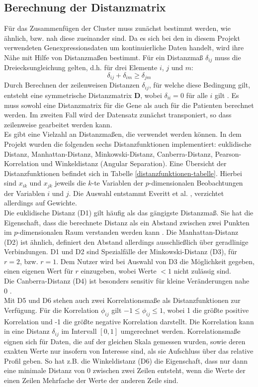 \documentclass[12pt]{article}
\begin{document}
\subsection{Berechnung der Distanzmatrix}
\label{distanzfunktionen}
Für das Zusammenfügen der Cluster muss zunächst bestimmt werden, wie ähnlich, bzw. nah diese zueinander sind. Da es sich bei den in diesem Projekt verwendeten Genexpressionsdaten um kontinuierliche Daten handelt, wird ihre Nähe mit Hilfe von Distanzmaßen bestimmt. Für ein Distanzmaß $\delta_{ij}$ muss die Dreiecksungleichung gelten, d.h. für drei Elemente $i$, $j$ und $m$: 
\[ \delta_{ij} + \delta_{im} \ge \delta_{jm} \]
Durch Berechnen der zeilenweisen Distanzen  \( \delta_{ij} \), für welche diese Bedingung gilt, entsteht eine symmetrische Distanzmatrix \( \mathbf{D}\), wobei \( \delta_{ii}  = 0\) für alle \( i \) gilt \cite{Everitt2011}. Es muss sowohl eine Distanzmatrix für die Gene als auch für die Patienten berechnet werden. Im zweiten Fall wird der Datensatz zunächst transponiert, so dass zeilenweise gearbeitet werden kann.\\
Es gibt eine Vielzahl an Distanzmaßen, die verwendet werden können. In dem Projekt wurden die folgenden sechs Distanzfunktionen implementiert: euklidische Distanz, Manhattan-Distanz, Minkowski-Distanz, Canberra-Distanz, Pearson-Korrelation und Winkeldistanz (Angular Separation). Eine Übersicht der Distanzfunktionen befindet sich in Tabelle \ref{distanzfunktionen-tabelle}. Hierbei sind \( x_{ik} \) und \( x_{jk} \) jeweils die \(k\)-te Variablen der \(p\)-dimensionalen Beobachtungen der Variablen \(i\) und \(j\). Die Auswahl entstammt Everitt et al. \cite{Everitt2011}, verzichtet allerdings auf Gewichte.\\
Die euklidische Distanz (D1) gilt häufig als das gängigste Distanzmaß. Sie hat die Eigenschaft, dass die berechnete Distanz als ein Abstand zwischen zwei Punkten im $p$-dimensionalen Raum verstanden werden kann \cite{Everitt2011}. Die Manhattan-Distanz (D2) ist ähnlich, definiert den Abstand allerdings ausschließlich über geradlinige Verbindungen. D1 und D2 sind Spezialfälle der Minkowski-Distanz (D3), für $r = 2$, bzw. $r = 1$. Dem Nutzer wird bei Auswahl von D3 die Möglichkeit gegeben, einen eigenen Wert für $r$ einzugeben, wobei Werte $<1$ nicht zulässig sind.\\
Die Canberra-Distanz (D4) ist besonders sensitiv für kleine Veränderungen nahe 0 \cite{Everitt2011}. \\
Mit D5 und D6 stehen auch zwei Korrelationsmaße als Distanzfunktionen zur Verfügung. Für die Korrelation \( \phi_{ij}\) gilt \( -1 \le \phi_{ij} \le 1 \), wobei 1 die größte positive Korrelation und -1 die größte negative Korrelation darstellt. Die Korrelation kann in eine Distanz \( \delta_{ij} \) im Intervall \( [0,1] \) umgerechnet werden. Korrelationsmaße eignen sich für Daten, die auf der gleichen Skala gemessen wurden, sowie deren exakten Werte nur insofern von Interesse sind, als sie Aufschluss über das relative Profil geben. So hat z.B. die Winkeldistanz (D6) die Eigenschaft, dass nur dann eine minimale Distanz von 0 zwischen zwei Zeilen entsteht, wenn die Werte der einen Zeilen Mehrfache der Werte der anderen Zeile sind.\\
\end{document}
